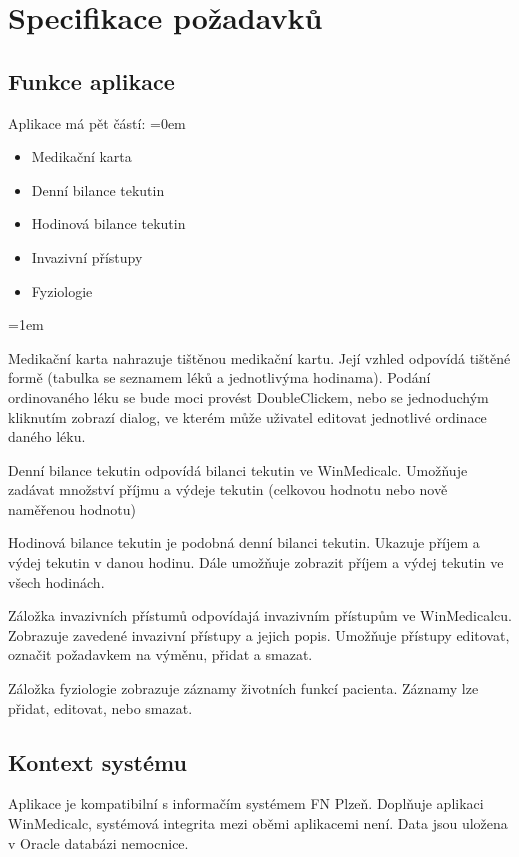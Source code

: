\chapter{Specifikace požadavků}
\label{ch:specifikace}

\section{Funkce aplikace}

Aplikace má pět částí:
\parskip=0em
\begin{itemize}
	\item Medikační karta
	\item Denní bilance tekutin
	\item Hodinová bilance tekutin
	\item Invazivní přístupy
	\item Fyziologie
\end{itemize}
\parskip=1em

Medikační karta nahrazuje tištěnou medikační kartu. Její vzhled odpovídá tištěné formě (tabulka se seznamem léků a jednotlivýma hodinama). Podání ordinovaného léku se bude moci provést DoubleClickem, nebo se jednoduchým kliknutím zobrazí dialog, ve kterém může uživatel editovat jednotlivé ordinace daného léku.

Denní bilance tekutin odpovídá bilanci tekutin ve WinMedicalc. Umožňuje zadávat množství příjmu a výdeje tekutin (celkovou hodnotu nebo nově naměřenou hodnotu)

Hodinová bilance tekutin je podobná denní bilanci tekutin. Ukazuje příjem a výdej tekutin v danou hodinu. Dále umožňuje zobrazit příjem a výdej tekutin ve všech hodinách.

Záložka invazivních přístumů odpovídajá invazivním přístupům ve WinMedicalcu. Zobrazuje zavedené invazivní přístupy a jejich popis. Umožňuje přístupy editovat, označit požadavkem na výměnu, přidat a smazat.

Záložka fyziologie zobrazuje záznamy životních funkcí pacienta. Záznamy lze přidat, editovat, nebo smazat.


\section{Kontext systému}

Aplikace je kompatibilní s informačím systémem FN Plzeň. Doplňuje aplikaci WinMedicalc, systémová integrita mezi oběmi aplikacemi není. Data jsou uložena v Oracle databázi nemocnice.

